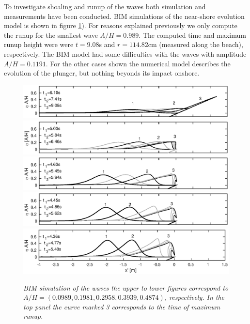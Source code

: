 \documentclass[a4paper, 11pt, english, twoside, openright]{article}
\begin{document}
To investigate shoaling and runup of the waves 
both simulation and measurements have been conducted. 
BIM simulations of the near-shore evolution model is shown in figure \ref{fig:BIM}).
For reasons explained previously we only compute the runup for the 
smallest wave $A/H=0.989$. The computed time and maximum runup height 
were were $t=9.08$s and  $r=114.82$cm (measured along the beach), 
respectively. The BIM model had some difficulties with the waves with amplitude $A/H=0.1191$. For the other cases shown the numerical
model describes the evolution of the plunger, but nothing beyonds its impact onshore.  
\begin{figure}[]
\centering 
\includegraphics[width=\textwidth]{./Figures/BIM_s/case10.eps}
\includegraphics[width=\textwidth]{./Figures/BIM_s/case20.eps}
\includegraphics[width=\textwidth]{./Figures/BIM_s/case30.eps}
\includegraphics[width=\textwidth]{./Figures/BIM_s/case40.eps}
\includegraphics[width=1.015\textwidth]{./Figures/BIM_s/case50.eps}
\caption{\textit{BIM simulation of the waves the upper to lower figures correspond to $A/H=(0.0989, 0.1981, 0.2958, 0.3939, 0.4874)$, respectively. In the top panel the curve marked 3 corresponds to the time of maximum runup.}}
\label{fig:BIM}
\end{figure}
\end{document}
